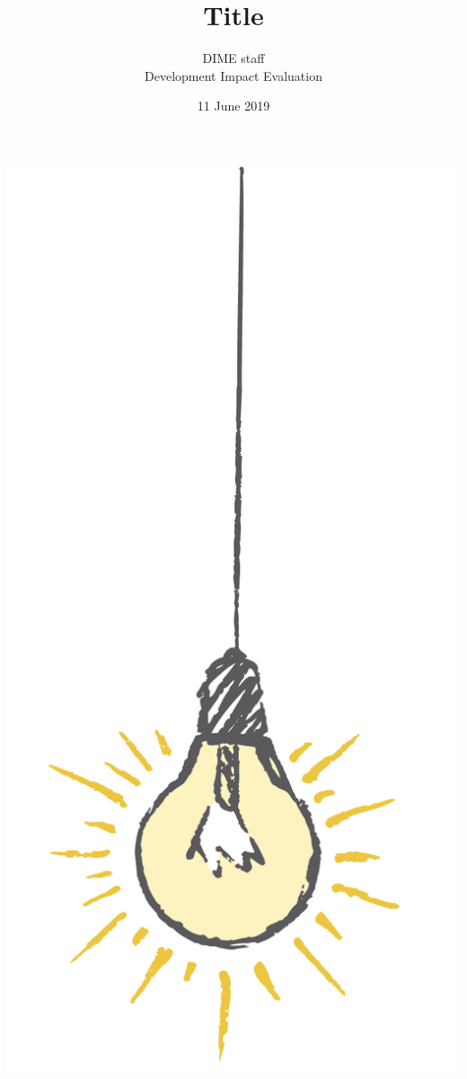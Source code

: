 \documentclass{tufte-handout}
\title{Title}
\author{DIME staff \\ Development Impact Evaluation}
\date{11 June 2019}  %
\begin{document}
	
	\maketitle%
	
	\begin{marginfigure}%
		\includegraphics[width=\linewidth]{img/light.png}
	\end{marginfigure}
	
\end{document}
